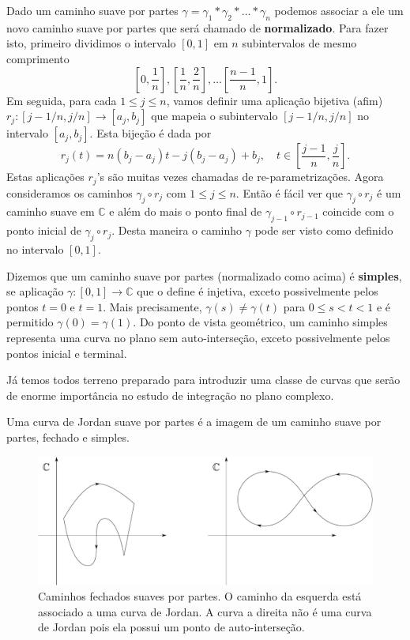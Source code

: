 Dado um caminho suave por partes $\gamma= \gamma_1*\gamma_2*\ldots*\gamma_n$
podemos associar a ele um novo caminho suave por partes 
que será chamado de {\bf normalizado}.
Para fazer isto, primeiro dividimos o intervalo $[0,1]$ em $n$ subintervalos de
mesmo comprimento
\[
\left[0,\frac{1}{n} \right],
\left[\frac{1}{n},\frac{2}{n} \right],
\ldots
\left[\frac{n-1}{n},1 \right].
\]
Em seguida, para cada $1\leqslant j\leqslant n$, vamos definir uma aplicação bijetiva (afim) 
$r_{j}:[j-1/n,j/n]\to [a_j,b_j]$ que mapeia o subintervalo $[j-1/n,j/n]$ no intervalo $[a_j,b_j]$. 
Esta bijeção é dada por 
\[
r_j(t) = n(b_j-a_j)t-j(b_j-a_j)+b_j, \quad t\in\left[\frac{j-1}{n},\frac{j}{n}\right].
\]
Estas aplicações $r_j$'s são muitas vezes chamadas de re-parametrizações. 
Agora consideramos os caminhos $\gamma_{j}\circ r_j$ com $1\leqslant j\leqslant n$.
Então é fácil ver que $\gamma_{j}\circ r_j$ é um caminho suave em $\mathbb{C}$ e além do 
mais o ponto final de $\gamma_{j-1}\circ r_{j-1}$ coincide com o ponto inicial de 
$\gamma_{j}\circ r_j$. Desta maneira o caminho $\gamma$ pode ser visto como definido 
no intervalo $[0,1]$. 

Dizemos que um caminho suave por partes (normalizado como acima) 
é {\bf simples}, se aplicação $\gamma:[0,1]\to\mathbb{C}$ que o define
é injetiva, exceto possivelmente pelos pontos $t=0$ e $t=1$. Mais precisamente, $\gamma(s)\neq \gamma(t)$
para $0\leqslant s<t<1$ e é permitido $\gamma(0)=\gamma(1)$. 
Do ponto de vista geométrico, um caminho simples representa uma curva no plano sem 
auto-interseção, exceto possivelmente pelos pontos inicial e terminal. 


Já temos todos terreno preparado para introduzir uma classe de curvas 
que serão de enorme importância no estudo de integração no plano 
complexo. 

\begin{definicao}
\label{def-curva-jordan}
Uma curva de Jordan suave por partes é a imagem de um caminho suave por partes, fechado e simples. 
\end{definicao}


\begin{figure}[H]
\centering
\includegraphics[scale=0.4]{Figuras/fig-curvas-fechadas}
\caption{Caminhos fechados suaves por partes. O caminho da esquerda está associado a uma curva de Jordan. A curva a direita não é uma curva de Jordan pois ela possui um ponto de auto-interseção.}
\label{fig-curvas-fechadas}
\end{figure}



